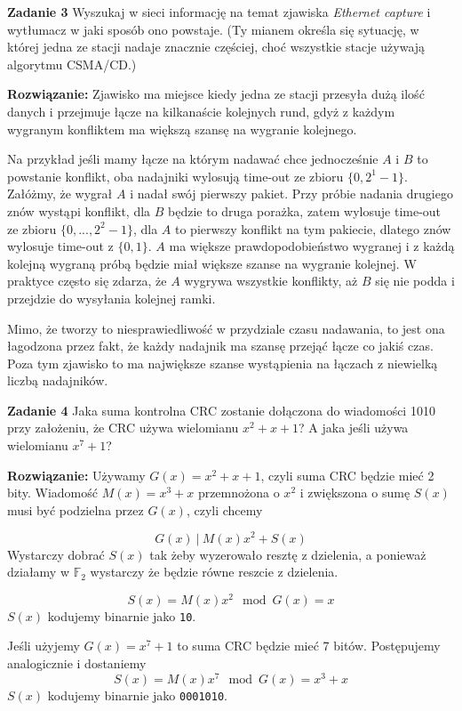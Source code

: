\documentclass[12pt,a4paper]{article}
\begin{document}
\vskip10pt

\noindent
\textbf{Zadanie 3} Wyszukaj w sieci informację na temat zjawiska \emph{Ethernet capture} i wytłumacz w jaki sposób ono powstaje. (Ty mianem określa się sytuację, w której jedna ze stacji nadaje znacznie częściej, choć wszystkie stacje używają algorytmu CSMA/CD.)

\vskip5pt
\noindent
\textbf{Rozwiązanie:} Zjawisko ma miejsce kiedy jedna ze stacji przesyła dużą ilość danych i przejmuje łącze na kilkanaście kolejnych rund, gdyż z każdym wygranym konfliktem ma większą szansę na wygranie kolejnego.

Na przykład jeśli mamy łącze na którym nadawać chce jednocześnie \(A\) i \(B\) to powstanie konflikt, oba nadajniki wylosują time-out ze zbioru \(\{0, 2^1-1\}\). Załóżmy, że wygrał \(A\) i nadał swój pierwszy pakiet. Przy próbie nadania drugiego znów wystąpi konflikt, dla \(B\) będzie to druga porażka, zatem wylosuje time-out ze zbioru \(\{0,...,2^2-1\}\), dla \(A\) to pierwszy konflikt na tym pakiecie, dlatego znów wylosuje time-out z \(\{0,1\}\). \(A\) ma większe prawdopodobieństwo wygranej i z każdą kolejną wygraną próbą będzie miał większe szanse na wygranie kolejnej. W praktyce często się zdarza, że \(A\) wygrywa wszystkie konflikty, aż \(B\) się nie podda i przejdzie do wysyłania kolejnej ramki.

Mimo, że tworzy to niesprawiedliwość w przydziale czasu nadawania, to jest ona łagodzona przez fakt, że każdy nadajnik ma szansę przejąć łącze co jakiś czas. Poza tym zjawisko to ma największe szanse wystąpienia na łączach z niewielką liczbą nadajników.

\vskip10pt
\noindent
\textbf{Zadanie 4} Jaka suma kontrolna CRC zostanie dołączona do wiadomości 1010 przy założeniu, że CRC używa wielomianu \(x^2 + x + 1\)? A jaka jeśli używa wielomianu \( x^7 + 1 \)?

\vskip5pt
\noindent
\textbf{Rozwiązanie:} Używamy \(G(x) = x^2 + x + 1\), czyli suma CRC będzie mieć 2 bity. Wiadomość \(M(x) = x^3 + x\) przemnożona o \(x^2\) i zwiększona o sumę \(S(x)\) musi być podzielna przez \(G(x)\), czyli chcemy

\[
 G(x)~ |~ M(x) x^2 + S(x)
\]
Wystarczy dobrać \(S(x)\) tak żeby wyzerowało resztę z dzielenia, a ponieważ działamy w \(\mathbb{F}_2\) wystarczy że będzie równe reszcie z dzielenia.

\[
	S(x) = M(x)x^2 \mod G(x) = x
\]
\(S(x)\) kodujemy binarnie jako \texttt{10}.

Jeśli użyjemy \(G(x) = x^7 + 1\) to suma CRC będzie mieć 7 bitów. Postępujemy analogicznie i dostaniemy
\[
	S(x) = M(x)x^7 \mod G(x) = 	x^3 + x
\]
\(S(x)\) kodujemy binarnie jako \texttt{0001010}.
\end{document}

